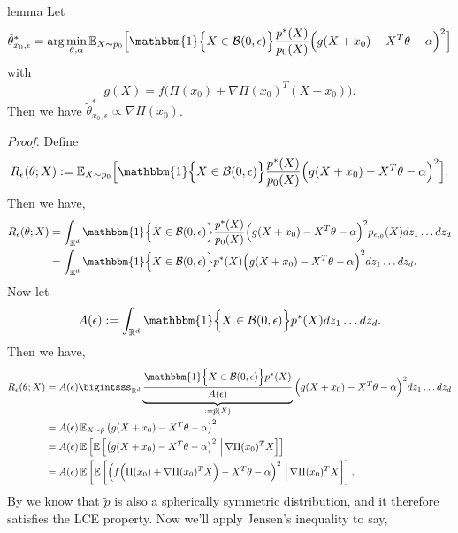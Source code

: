 \documentclass[11pt]{article}
\begin{document}
\begin{restatable}[Surrogate]{lemma}{} \label{lemma: surrogate problem} Let 
\[\tilde{\theta}^*_{x_0, \epsilon} = \arg\min_{\theta, \alpha}\mathbb{E}_{X\sim p_{0}}\Big[\mathbbm{1}\Big\{X \in \mathcal{B}(0, \epsilon)\Big\}\frac{p^*(X)}{p_{0}(X)}\Big(g(X + x_0) - X^{T}\theta - \alpha \Big)^2\Big]\]
with 
\[g(X) = f\Big(\Pi(x_0) + \nabla\Pi(x_0)^{T}(X-x_0)\Big).\]
Then we have $\tilde{\theta}^*_{x_0, \epsilon} \propto \nabla \Pi(x_0)$. 
\end{restatable}
\noindent \textit{Proof.} Define 
\[R_{\epsilon}(\theta; X) := \mathbb{E}_{X\sim p_{0}}\Big[\mathbbm{1}\Big\{X \in \mathcal{B}(0, \epsilon)\Big\}\frac{p^*(X)}{p_{0}(X)}\Big(g(X + x_0) - X^{T}\theta - \alpha \Big)^2\Big].\]
Then we have,
\begin{align*}
    R_{\epsilon}(\theta; X)&= \int_{\mathbb{R}^d}\mathbbm{1}\Big\{X \in \mathcal{B}(0, \epsilon)\Big\}\frac{p^*(X)}{p_{0}(X)}\Big(g(X+x_0) - X^{T}\theta - \alpha\Big)^2p_{\epsilon,_0}(X) dz_1 \dots dz_d \\
    &= \int_{\mathbb{R}^d}\mathbbm{1}\Big\{X \in \mathcal{B}(0, \epsilon)\Big\}p^*(X)\Big(g(X + x_0) - X^{T}\theta - \alpha \Big)^2 dz_1 \dots dz_d.
\end{align*}
Now let 
\begin{equation}
    A(\epsilon) := \int_{\mathbb{R}^d} \mathbbm{1}\Big\{X \in \mathcal{B}(0, \epsilon)\Big\}p^*(X) dz_1 \dots dz_d.
\end{equation}
Then we have,
\begin{align*}
    R_{\epsilon}(\theta; X)&= A(\epsilon) \bigintsss_{\mathbb{R}^d}\underbrace{\frac{\mathbbm{1}\Big\{X \in \mathcal{B}(0, \epsilon)\Big\}p^*(X)}{A(\epsilon)}}_{:= \tilde{p}(X)}\Big(g(X+x_0) - X^{T}\theta - \alpha\Big)^2 dz_1 \dots dz_d \\
    &= A(\epsilon)\, \mathbb{E}_{X \sim \tilde{p}}\left(g(X+x_0)-X^{T}\theta - \alpha\right)^2 \\
    &= A(\epsilon)\,\mathbb{E}\left[\mathbb{E}\left[\left(g(X+x_0)-X^{T}\theta - \alpha\right)^2 \, \Big| 
    \, \nabla\Pi(x_0)^{T}X\right]\right]\\
    &= A(\epsilon)\,\mathbb{E}\left[\mathbb{E}\left[\left(f\Big(\Pi(x_0) + \nabla\Pi(x_0)^{T}X\Big)-X^{T}\theta-\alpha\right)^2 \, \Big| 
    \, \nabla\Pi(x_0)^{T}X\right]\right].
\end{align*}
By  we know that $\tilde{p}$ is also a spherically symmetric distribution, and it therefore satisfies the LCE property. Now we'll apply Jensen's inequality to say,
\end{document}
